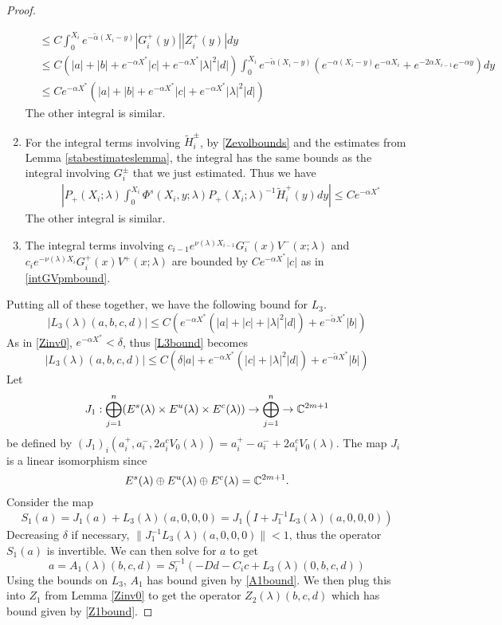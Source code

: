 \documentclass[thesis.tex]{subfiles}
\begin{document}
\begin{lemma}
\begin{proof}
\begin{enumerate}
\begin{align*}
&\leq C \int_0^{X_i} e^{-\tilde{\alpha}(X_i - y)} |G_i^+(y)| |Z_i^+(y)| dy \\
&\leq C \left(|a| + |b| + e^{-\alpha X^*} |c| + e^{-\alpha X^*}|\lambda|^2|d|\right) \int_0^{X_i} e^{-\tilde{\alpha}(X_i - y)} \left(e^{-\alpha(X_i - y)}e^{-\alpha X_i} + e^{-2 \alpha X_{i-1}} e^{-\alpha y} \right) dy \\
&\leq C e^{-\alpha X^*} \left(|a| + |b| + e^{-\alpha X^*} |c| + e^{-\alpha X^*}|\lambda|^2|d|\right)
\end{align*}
The other integral is similar.

\item For the integral terms involving $\tilde{H}_i^\pm$, by \eqref{Zevolbounds} and the estimates from Lemma \ref{stabestimateslemma}, the integral has the same bounds as the integral involving $G_i^\pm$ that we just estimated. Thus we have
\begin{align*}
&\left|
P_+(X_i; \lambda) \int_0^{X_i} \Phi^s(X_i, y; \lambda) P_+(X_i; \lambda)^{-1} \tilde{H}_i^+(y) dy \right| \leq C e^{-\alpha X^*} 
\end{align*}
The other integral is similar.

\item The integral terms involving $c_{i-1} e^{\nu(\lambda) X_{i-1}} G_i^-(x) V^-(x; \lambda)$ and $c_i e^{-\nu(\lambda) X_i} G_i^+(x) V^+(x; \lambda)$ are bounded by $C e^{-\alpha X^*} |c|$ as in \cref{intGVpmbound}. 
\end{enumerate}

Putting all of these together, we have the following bound for $L_3$.
\begin{equation}\label{L3bound}
|L_3(\lambda)(a, b, c, d)| \leq C \left( e^{-\alpha X^*} (|a| + |c| + |\lambda|^2 |d|) + e^{-\tilde{\alpha} X^*} |b| \right)
\end{equation}
As in \cref{Zinv0}, $e^{-\alpha X^*} < \delta$, thus \cref{L3bound} becomes
\begin{equation*}
|L_3(\lambda)(a, b, c, d)| \leq C \left( \delta |a| + e^{-\alpha X^*}(|c| + |\lambda|^2 |d|) + e^{-\tilde{\alpha} X^*} |b| \right)
\end{equation*}
Let 
\[
J_1: \bigoplus_{j=1}^n (E^s(\lambda) \times E^u(
\lambda) \times E^c(\lambda) ) \rightarrow \bigoplus_{j=1}^n \rightarrow \mathbb{C}^{2m+1}
\]
be defined by $(J_1)_i(a_i^+, a_i^-, 2 a_i^c V_0(\lambda)) = a_i^+ - a_i^- + 2 a_i^c V_0(\lambda)$. The map $J_i$ is a linear isomorphism since 
\[
E^s(\lambda) \oplus E^u(\lambda) \oplus E^c(\lambda) = \mathbb{C}^{2m+1}.
\]
Consider the map
\[
S_1(a) = J_1(a) + L_3(\lambda)(a, 0, 0, 0) = J_1\left( I + J_1^{-1} L_3(\lambda)(a, 0, 0, 0)\right)
\]
Decreasing $\delta$ if necessary, $\|J_1^{-1} L_3(\lambda)(a, 0, 0, 0)\| < 1$, thus the operator $S_1(a)$ is invertible. We can then solve for $a$ to get
\[
a = A_1(\lambda)(b, c, d) = S_i^{-1}\left(-D d - C_i c + L_3(\lambda)(0, b, c, d)\right)
\]
Using the bounds on $L_3$, $A_1$ has bound given by \cref{A1bound}. We then plug this into $Z_1$ from Lemma \ref{Zinv0} to get the operator $Z_2(\lambda)(b,c,d)$ which has bound given by \cref{Z1bound}.
\end{proof}
\end{lemma}
\end{document}
